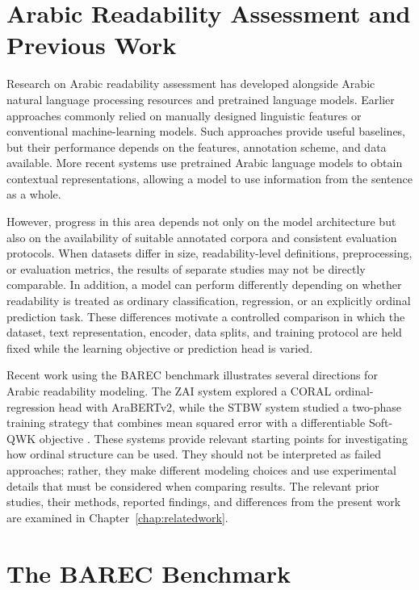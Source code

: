 \documentclass[12pt]{report}
\begin{document}
\section{Arabic Readability Assessment and Previous Work}

Research on Arabic readability assessment has developed alongside Arabic natural language processing resources and pretrained language models. Earlier approaches commonly relied on manually designed linguistic features or conventional machine-learning models. Such approaches provide useful baselines, but their performance depends on the features, annotation scheme, and data available. More recent systems use pretrained Arabic language models to obtain contextual representations, allowing a model to use information from the sentence as a whole.

However, progress in this area depends not only on the model architecture but also on the availability of suitable annotated corpora and consistent evaluation protocols. When datasets differ in size, readability-level definitions, preprocessing, or evaluation metrics, the results of separate studies may not be directly comparable. In addition, a model can perform differently depending on whether readability is treated as ordinary classification, regression, or an explicitly ordinal prediction task. These differences motivate a controlled comparison in which the dataset, text representation, encoder, data splits, and training protocol are held fixed while the learning objective or prediction head is varied.

Recent work using the BAREC benchmark illustrates several directions for Arabic readability modeling. The ZAI system explored a CORAL ordinal-regression head with AraBERTv2, while the STBW system studied a two-phase training strategy that combines mean squared error with a differentiable Soft-QWK objective \cite{nazzal2025zai,trigui2025stbw}. These systems provide relevant starting points for investigating how ordinal structure can be used. They should not be interpreted as failed approaches; rather, they make different modeling choices and use experimental details that must be considered when comparing results. The relevant prior studies, their methods, reported findings, and differences from the present work are examined in Chapter~\ref{chap:relatedwork}.

\section{The BAREC Benchmark}
\end{document}
